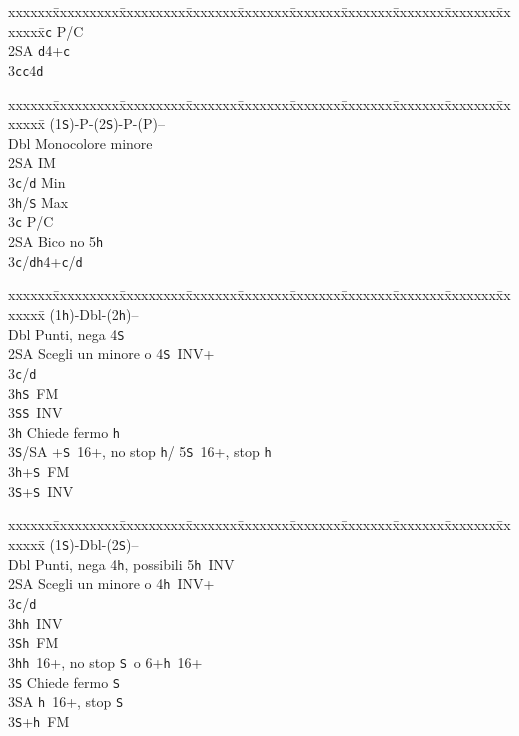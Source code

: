 \documentclass[a4paper,italian]{article}
\newcommand{\BS}{\small{\texttt{S}}}
\newcommand{\BC}{\small{\texttt{c}}}
\newcommand{\BD}{\small{\texttt{d}}}
\newcommand{\BH}{\small{\texttt{h}}}
\newenvironment{bidtable}
{\begin{tabbing}

    xxxxxx\=xxxxxxxxx\=xxxxxxxxx\=xxxxxxx\=xxxxxxx\=xxxxxxx\=xxxxxxx\=xxxxxxx\=xxxxxxx\=xxxxxxx\=\kill}
{\end{tabbing} }%
\begin{document}
\begin{multicols}{2}
\begin{bidtable}
        3\BC \> P/C\-\\
        2\small{SA} \BD 4+\BC \\
        3\BC {}\BC 4\BD
    \end{bidtable}
    \vfill\null
    \columnbreak
    \begin{bidtable}
        (1\BS)-P-(2\BS)-P-(P)--\+\\
        Dbl \> Monocolore minore\+\\
        2\small{SA} \> IM\+\\
        3\BC/\BD \> Min\\
        3\BH/\BS \> Max\-\\
        3\BC \> P/C\-\\
        2\small{SA} \> Bico no 5\BH \\
        3\BC/\BD {}\BH 4+\BC /\BD
    \end{bidtable}
    \begin{bidtable}
        (1\BH)-Dbl-(2\BH)--\+\\
        Dbl\> Punti, nega 4\BS\\
        2\small{SA} \> Scegli un minore o 4\BS\ INV+\+\\
        3\BC/\BD\+\\
        3\BH {}\BS\ FM\\
        3\BS {}\BS\ INV\-\\
        3\BH \> Chiede fermo \BH\\
        3\BS/SA +\BS\ 16+, no stop \BH / 5\BS\ 16+, stop \BH\-\\
        3\BH {}+\BS\ FM\\
        3\BS {}+\BS\ INV
    \end{bidtable}
    \begin{bidtable}
        (1\BS)-Dbl-(2\BS)--\+\\
        Dbl\> Punti, nega 4\BH, possibili 5\BH\ INV\\
        2\small{SA} \> Scegli un minore o 4\BH\ INV+\+\\
        3\BC/\BD\+\\
        3\BH {}\BH\ INV\\
        3\BS {}\BH\ FM\-\\
        3\BH {}\BH\ 16+, no stop \BS\ o 6+\BH\ 16+\\
        3\BS \> Chiede fermo \BS\\
        3\small{SA} \BH\ 16+, stop \BS\-\\
        3\BS {}+\BH\ FM
    \end{bidtable}


\end{multicols}
\end{document}
